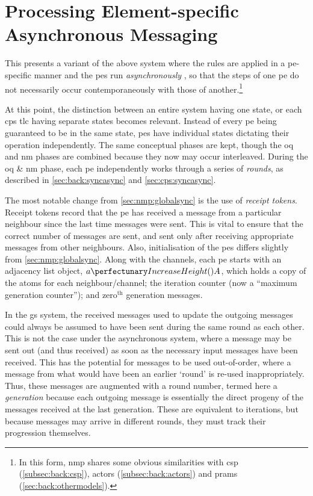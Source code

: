 \section{\label{sec:nmp:pespecific}Processing Element-specific Asynchronous Messaging}

This  presents a variant of the above system where the rules are applied in a \gls{pe}-specific manner and the \glspl{pe} run \emph{asynchronously} \cite{Balanescu2011,Nicolescu2014}, so that the steps of one \gls{pe} do not necessarily occur contemporaneously with those of another.\footnote{In this form, \gls{nmp} shares some obvious similarities with \Gls{csp} (\cref{subsec:back:csp}), \Glspl{actor} (\cref{subsec:back:actors}) and \Glspl{pram} (\cref{sec:back:othermodels}).}  

At this point, the distinction between an entire system having one state, or each \gls{cps} \gls{tlc} having separate states becomes relevant.  Instead of every \gls{pe} being guaranteed to be in the same state, \glspl{pe} have individual states dictating their operation independently.  The same conceptual phases are kept, though the \gls{oq} and \gls{nm} phases are combined because they now may occur interleaved.  During the \gls{oq} \& \gls{nm} phase, each \gls{pe} independently works through a series of \label{pg:nmp:rounds}\emph{rounds}, as described in \vref{sec:back:syncasync} and \vref{sec:cps:syncasync}.

The most notable change from \cref{sec:nmp:globalsync} is the use of \emph{receipt tokens}.  Receipt tokens record that the \gls{pe} has received a message from a particular neighbour since the last time messages were sent.  This is vital to ensure that the correct number of messages are sent, and sent only after receiving appropriate messages from other neighbours.  Also, initialisation of the \glspl{pe} differs slightly from \cref{sec:nmp:globalsync}.  Along with the channels, each \gls{pe} starts with an adjacency list object, \(\cpfunc{a}{A}\), which holds a copy of the atoms for each neighbour/channel; the iteration counter (now a ``maximum generation counter''); and \(\text{zero}^{\text{th}}\) generation messages.

In the \gls{gs} system, the received messages used to update the outgoing messages could always be assumed to have been sent during the same round as each other.  This is not the case under the asynchronous system, where a message may be sent out (and thus received) as soon as the necessary input messages have been received.  This has the potential for messages to be used out-of-order, where a message from what would have been an earlier `round' is re-used inappropriately.  Thus, these messages are augmented with a round number, termed here a \emph{generation} because each outgoing message is essentially the direct progeny of the messages received at the last generation.  These are equivalent to iterations, but because messages may arrive in different rounds, they must track their progression themselves.

